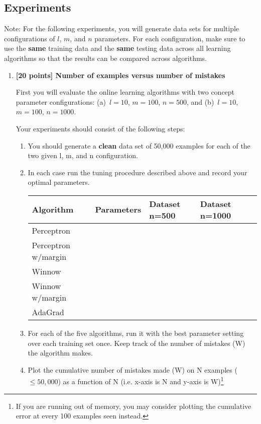\subsection*{Experiments}

Note: For the following experiments, you will generate data sets for multiple configurations of $l$, $m$, and $n$ parameters. For each configuration, make sure to use the \textbf{same} training data and the \textbf{same} testing data across all learning algorithms so that the results can be compared across algorithms.

\begin{enumerate}
\item {\bf [20 points] Number of examples versus number of mistakes}

First you will evaluate the online learning algorithms with two
concept parameter configurations: (a)~$l=10$, $m=100$, $n=500$, and
(b)~$l=10$, $m=100$, $n=1000$.

Your experiments should consist of the following steps:

\begin{enumerate}
\item You should generate a {\bf clean} data set of 50,000 examples for each of the two given l, m, and n configuration.

\item In each case run the tuning procedure described above and record your optimal
parameters.

  \begin{center}
    \begin{tabular}{|p{3.0cm}|p{2.2cm}|p{2.5cm}|p{2.5cm}|p{2.5cm}|}
      \hline
      Algorithm               &  Parameters & Dataset n=500 & Dataset n=1000\\\hline\hline
      Perceptron              &             &               &      \\\hline
      Perceptron w/margin     &             &               &      \\\hline
      Winnow                  &             &               &      \\\hline
      Winnow w/margin         &             &               &      \\\hline
      AdaGrad                 &             &               &      \\\hline
    \end{tabular}
  \end{center}
\item For each of the five algorithms, run it with the best parameter setting over each training set once. Keep track of the number of mistakes (W) the algorithm makes.
\item Plot the cumulative number of mistakes made (W) on N examples ($\le 50,000$) as a function of N (i.e. x-axis is N and y-axis is W)\footnote{If you are running out of memory, you may consider plotting the cumulative error at every 100 examples seen instead.}
\end{enumerate}


\end{enumerate}
